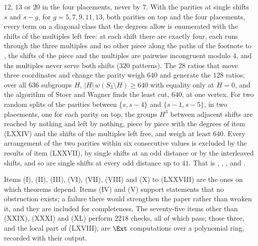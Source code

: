 \begin{enumerate}[label=\textup{(\Roman*)},leftmargin=*]
  $12$, $13$ or $20$ in the four placements, never by $7$. With the parities
  at single shifts $s$ and $s-g$, for $g=5,7,9,11,13$, both parities on top
  and the four placements, every term on a diagonal class that the degrees
  allow is enumerated with the shifts of the multiples left free: at each
  shift there are exactly four, each runs through the three multiples and no
  other piece along the paths of the footnote to , the
  shifts of the piece and the multiples are pairwise incongruent modulo $4$,
  and the multiples never serve both shifts ($320$ patterns). The $28$ ratios
  that move three coordinates and change the parity weigh $640$ and generate
  the $128$ ratios; over all $636$ subgroups $H$,
  $|H|\,w(S_{3}\setminus H)\ge640$ with equality only at $H=0$, and the
  algorithm of Stoer and Wagner finds the least cut, $640$, at one vertex.
  For two random splits of the parities between $\{s,s-4\}$ and
  $\{s-1,s-5\}$, in two placements, one for each parity on top, the groups
  $H^{3}$ between adjacent shifts are reached by nothing and left by
  nothing, piece by piece with the degrees of item (LXXIV) and the shifts of
  the multiples left free, and weigh at least $640$. Every arrangement of
  the two parities within six consecutive values is excluded by the results
  of item (LXXVII), by single shifts at an odd distance or by the
  interleaved shifts, and so are single shifts at every odd distance up to
  $41$. That is , ,
  ,  and
  .
\end{enumerate}

Items (I), (II), (III), (VI), (VII), (VIII) and (X) to (LXXVIII) are the ones
on which theorems depend. Items (IV) and (V) support statements that no
obstruction exists; a failure there would strengthen the paper rather than
weaken it, and they are included for completeness.
The seventy-five items other than (XXIX), (XXXI) and (XL) perform $2218$
checks, all of which pass; those three, and the local part of (LXVIII), are
$\Ext$ computations over a polynomial ring, recorded with their output.
